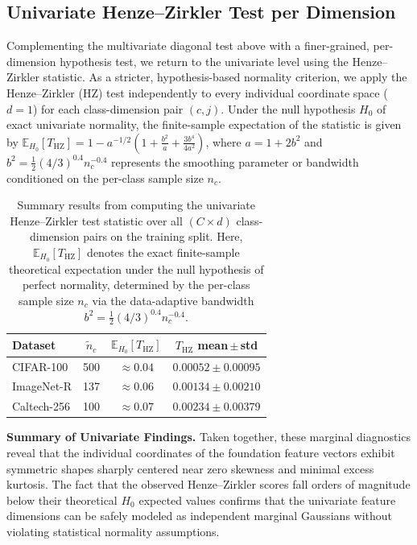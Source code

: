 \subsection{Univariate Henze--Zirkler Test per Dimension}
\label{sec:uv_hz_gaussianity_results}

Complementing the multivariate diagonal test above with a finer-grained, per-dimension hypothesis test, we return to the univariate level using the Henze--Zirkler statistic. As a stricter, hypothesis-based normality criterion, we apply the Henze--Zirkler (HZ) test independently to every individual coordinate space ($d=1$) for each class-dimension pair $(c, j)$. Under the null hypothesis $H_0$ of exact univariate normality, the finite-sample expectation of the statistic is given by $\mathbb{E}_{H_0}[T_{\mathrm{HZ}}] = 1 - a^{-1/2} \left(1 + \frac{b^2}{a} + \frac{3b^4}{4a^2}\right)$, where $a = 1 + 2b^2$ and $b^2 = \frac{1}{2}(4/3)^{0.4}n_c^{-0.4}$ represents the smoothing parameter or bandwidth conditioned on the per-class sample size $n_c$.

\begin{table}[htb]
	\centering
	\caption{Summary results from computing the univariate Henze--Zirkler test statistic over all $(C \times d)$ class-dimension pairs on the training split. Here, $\mathbb{E}_{H_0}[T_{\mathrm{HZ}}]$ denotes the exact finite-sample theoretical expectation under the null hypothesis of perfect normality, determined by the per-class sample size $n_c$ via the data-adaptive bandwidth $b^2 = \frac{1}{2}(4/3)^{0.4}n_c^{-0.4}$.}
	\label{tab:gaussianity_hz_univariate}
	\scriptsize
	\setlength{\tabcolsep}{4pt}
	\begin{tabular}{lcc c}
		\toprule
		\textbf{Dataset} & $\tilde{n}_c$ & $\mathbb{E}_{H_0}[T_{\mathrm{HZ}}]$ & $T_{\mathrm{HZ}}$ mean\,$\pm$\,std \\
		\midrule
		CIFAR-100  & 500 & $\approx 0.04$ & $0.00052 \pm 0.00095$ \\
		ImageNet-R  & 137 & $\approx 0.06$ & $0.00134 \pm 0.00210$  \\
		Caltech-256 & 100 & $\approx 0.07$ & $0.00234 \pm 0.00379$  \\
		\bottomrule
	\end{tabular}
\end{table}

\textbf{Summary of Univariate Findings.} Taken together, these marginal diagnostics reveal that the individual coordinates of the foundation feature vectors exhibit symmetric shapes sharply centered near zero skewness and minimal excess kurtosis. The fact that the observed Henze--Zirkler scores fall orders of magnitude below their theoretical $H_0$ expected values confirms that the univariate feature dimensions can be safely modeled as independent marginal Gaussians without violating statistical normality assumptions.

